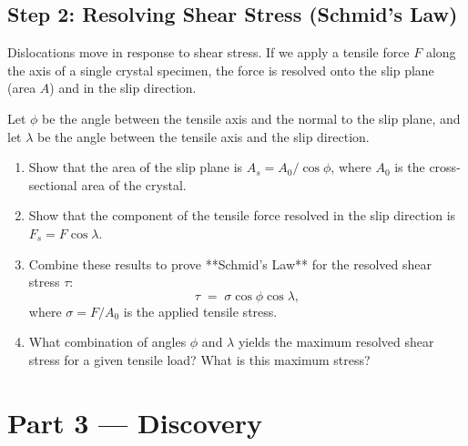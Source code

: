 \documentclass[12pt, a4paper]{book}
\begin{document}
\subsection{Step 2: Resolving Shear Stress (Schmid's Law)}

\begin{problembox}
Dislocations move in response to shear stress. If we apply a tensile force $F$ along the axis of a single crystal specimen, the force is resolved onto the slip plane (area $A$) and in the slip direction.

Let $\phi$ be the angle between the tensile axis and the normal to the slip plane, and let $\lambda$ be the angle between the tensile axis and the slip direction.

\begin{enumerate}[label=(\alph*)]
  \item Show that the area of the slip plane is $A_s = A_0 / \cos\phi$, where $A_0$ is the cross-sectional area of the crystal.
  \item Show that the component of the tensile force resolved in the slip direction is $F_s = F \cos\lambda$.
  \item Combine these results to prove **Schmid's Law** for the resolved shear stress $\tau$:
        \[
          \tau \;=\; \sigma \cos\phi \cos\lambda,
        \]
        where $\sigma = F / A_0$ is the applied tensile stress.
  \item What combination of angles $\phi$ and $\lambda$ yields the maximum resolved shear stress for a given tensile load? What is this maximum stress?
\end{enumerate}
\end{problembox}

\newpage

\section{Part 3 --- Discovery}
\end{document}
